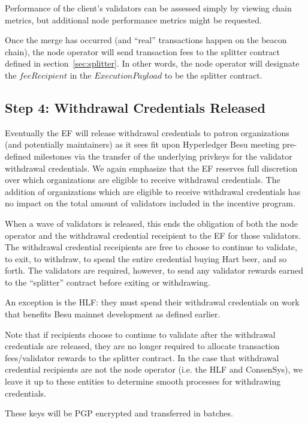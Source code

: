 Performance of the client’s validators can be assessed simply by viewing chain metrics, but additional node performance metrics might be requested.

Once the merge has occurred (and ``real'' transactions happen on the beacon chain), the node operator will send transaction fees to the splitter contract defined in section~\ref{sec:splitter}. In other words, the node operator will designate the $feeRecipient$ in the $ExecutionPayload$ to be the splitter contract.

\subsection{Step 4:  Withdrawal Credentials Released}
Eventually the EF will release withdrawal credentials to patron organizations (and potentially maintainers) as it sees fit upon Hyperledger Besu meeting pre-defined milestones via the transfer of the underlying privkeys for the validator withdrawal credentials.  We again emphasize that the EF reserves full discretion over which organizations are eligible to receive withdrawal credentials. The addition of organizations which are eligible to receive withdrawal credentials has no impact on the total amount of validators included in the incentive program.

When a wave of validators is released, this ends the obligation of both the node operator and the withdrawal credential receipient to the EF for those validators. The withdrawal credential receipients are free to choose to continue to validate, to exit, to withdraw, to spend the entire credential buying Hart beer, and so forth.  The validators are required, however, to send any validator rewards earned to the ``splitter'' contract before exiting or withdrawing.

An exception is the HLF:  they must spend their withdrawal credentials on work that benefits Besu mainnet development as defined earlier.

Note that if recipients choose to continue to validate after the withdrawal credentials are released, they are no longer required to allocate transaction fees/validator rewards to the splitter contract.  In the case that withdrawal credential recipients are not the node operator (i.e. the HLF and ConsenSys), we leave it up to these entities to determine smooth processes for withdrawing credentials.

These keys will be PGP encrypted and transferred in batches.
